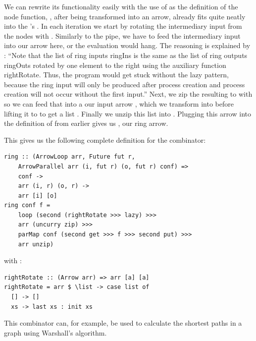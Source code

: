 We can rewrite its functionality easily with the use of  as the definition of the node function, , after being transformed into an arrow, already fits quite neatly into the 's . In each iteration we start by rotating the intermediary input from the nodes \code{[fut r]} with . Similarly to the pipe, we have to feed the intermediary input into our  arrow here, or the evaluation would hang. The reasoning is explained by \citet{eden_cefp}:
\enquote{Note that the list of ring inputs ringIns is the same as the list of ring outputs ringOuts rotated by one element to the right using the auxiliary function rightRotate. Thus, the program would get stuck without the lazy pattern, because the ring input will only be produced after process creation and process creation will not occur without the first input.}
Next, we zip the resulting \code{([i], [fut r])} to \code{[(i, fut r)]} with  so we can feed that into a our input arrow , which we transform into  before lifting it to  to get a list \code{[(o, fut r)]}. Finally we unzip this list into \code{([o], [fut r])}. Plugging this arrow  into the definition of  from earlier gives us , our ring arrow.


This gives us the following complete definition for the  combinator:
\begin{lstlisting}[frame=htrbl]
ring :: (ArrowLoop arr, Future fut r,
	ArrowParallel arr (i, fut r) (o, fut r) conf) =>
    conf ->
    arr (i, r) (o, r) ->
    arr [i] [o]
ring conf f =
	loop (second (rightRotate >>> lazy) >>>
    arr (uncurry zip) >>>
    parMap conf (second get >>> f >>> second put) >>>
    arr unzip)
\end{lstlisting}
with :
\begin{lstlisting}[frame=htrbl]
rightRotate :: (Arrow arr) => arr [a] [a]
rightRotate = arr $ \list -> case list of 
  [] -> []
  xs -> last xs : init xs
\end{lstlisting} %
This combinator can, for example, be used to calculate the shortest paths in a graph using Warshall's algorithm. 
